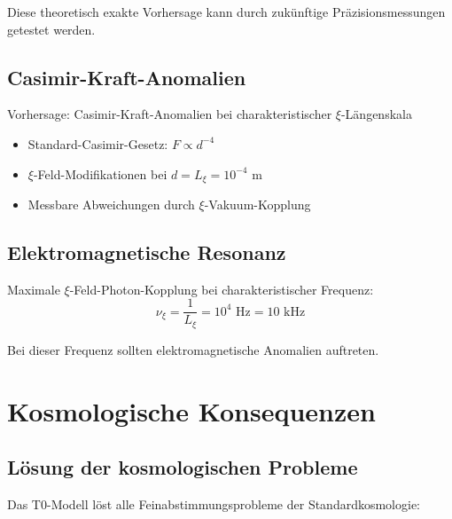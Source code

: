 \documentclass[12pt,a4paper]{article}
\begin{document}
	Diese theoretisch exakte Vorhersage kann durch zukünftige Präzisionsmessungen getestet werden.
	
	\subsection{Casimir-Kraft-Anomalien}
	
	\begin{experiment}
		Vorhersage: Casimir-Kraft-Anomalien bei charakteristischer $\xi$-Längenskala
		\begin{itemize}
			\item Standard-Casimir-Gesetz: $F \propto d^{-4}$
			\item $\xi$-Feld-Modifikationen bei $d = L_\xi = 10^{-4}$ m
			\item Messbare Abweichungen durch $\xi$-Vakuum-Kopplung
		\end{itemize}
	\end{experiment}
	
	\subsection{Elektromagnetische Resonanz}
	
	Maximale $\xi$-Feld-Photon-Kopplung bei charakteristischer Frequenz:
	\begin{equation}
		\nu_\xi = \frac{1}{L_\xi} = 10^{4} \text{ Hz} = 10 \text{ kHz}
	\end{equation}
	
	Bei dieser Frequenz sollten elektromagnetische Anomalien auftreten.
	
	\section{Kosmologische Konsequenzen}
	
	\subsection{Lösung der kosmologischen Probleme}
	
	Das T0-Modell löst alle Feinabstimmungsprobleme der Standardkosmologie:
	
\end{document}
